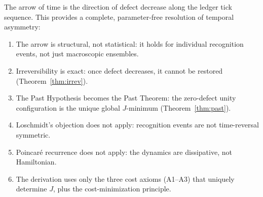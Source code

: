 \documentclass[12pt,a4paper]{article}
\theoremstyle{definition}
\theoremstyle{remark}
\begin{document}
The arrow of time is the direction of defect decrease along the ledger
tick sequence.  This provides a complete, parameter-free resolution of
temporal asymmetry:
\begin{enumerate}[nosep]
  \item The arrow is structural, not statistical: it holds for
  individual recognition events, not just macroscopic ensembles.
  \item Irreversibility is exact: once defect decreases, it cannot be
  restored (Theorem~\ref{thm:irrev}).
  \item The Past Hypothesis becomes the Past Theorem: the zero-defect
  unity configuration is the unique global $J$-minimum
  (Theorem~\ref{thm:past}).
  \item Loschmidt's objection does not apply: recognition events are
  not time-reversal symmetric.
  \item Poincar\'e recurrence does not apply: the dynamics are
  dissipative, not Hamiltonian.
  \item The derivation uses only the three cost axioms (A1--A3) that
  uniquely determine $J$, plus the cost-minimization principle.
\end{enumerate}
\end{document}
